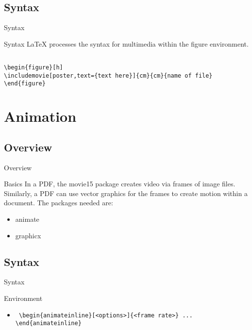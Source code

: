 \documentclass[article]{beamer}
\begin{document}
\subsection{Syntax}

\begin{frame}[fragile]{Syntax}

\begin{block}{Syntax}
\LaTeX {} processes the syntax for multimedia within the figure environment.
\begin{verbatim}

\begin{figure}[h]
\includemovie[poster,text={text here}]{cm}{cm}{name of file}
\end{figure}

\end{verbatim}

\end{block}

\end{frame}

\section{Animation}
\subsection{Overview}

\begin{frame}[fragile]{Overview}

\begin{block}{Basics}
In a PDF, the movie15 package creates video via frames of image files. Similarly, a PDF can use vector graphics for the frames to create motion within a document. The packages needed are:
\begin{itemize}
\item animate
\item graphicx
\end{itemize}
\end{block}

\end{frame}

\subsection{Syntax}

\begin{frame}[fragile]{Syntax}

\begin{block}{Environment}

\begin{itemize}
\item \verb! \begin{animateinline}[<options>]{<frame rate>} ... \end{animateinline}!
\end{itemize}

\end{block}

\end{frame}
\end{document}
